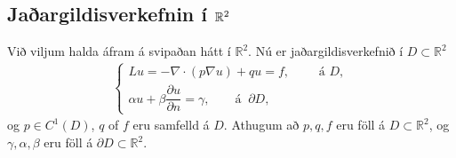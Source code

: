 \documentclass[a4paper,10pt,icelandic]{sphinxmanual}
\begin{document}
\subsection{Jaðargildisverkefnin í \protect\(\mathbb{R}^2\protect\)}
\label{\detokenize{Kafli06:jaargildisverkefnin-i-mathbb-r-2}}\label{\detokenize{Kafli06:ch-6-1-2}}
Við viljum halda áfram á svipaðan hátt í \(\mathbb{R}^2\). Nú er jaðargildisverkefnið í \(D\subset \mathbb{R}^2\)
\begin{equation}\label{equation:Kafli06:eq.system2}
\begin{split}\begin{cases}
Lu=-\nabla\cdot (p\nabla u)+qu=f, \qquad \text{ á } D,\\
\alpha u+\beta\dfrac{\partial u}{\partial n}
=\gamma, \qquad  \text{á } \ \partial D,
\end{cases}\end{split}
\end{equation}
og \(p\in C^1(D)\), \(q\) of \(f\) eru samfelld á \(D\). Athugum að \(p, q, f\) eru föll á \(D\subset \mathbb{R}^2\), og \(\gamma, \alpha, \beta\) eru föll á \(\partial D\subset \mathbb{R}^2\).
\end{document}
